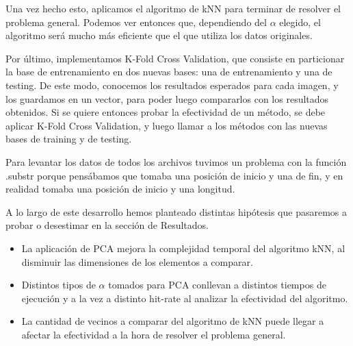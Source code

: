 \documentclass{article}
\begin{document}

Una vez hecho esto, aplicamos el algoritmo de kNN para terminar de resolver el problema general. Podemos ver entonces que, dependiendo del $\alpha$ elegido, el algoritmo será mucho más eficiente que el que utiliza los datos originales.

Por último, implementamos K-Fold Cross Validation, que consiste en particionar la base de entrenamiento en dos nuevas bases: una de entrenamiento y una de testing. De este modo, conocemos los resultados esperados para cada imagen, y los guardamos en un vector, para poder luego compararlos con los resultados obtenidos. Si se quiere entonces probar la efectividad de un método, se debe aplicar K-Fold Cross Validation, y luego llamar a los métodos con las nuevas bases de training y de testing.

Para levantar los datos de todos los archivos tuvimos un problema con la función .substr porque pensábamos que tomaba una posición de inicio y una de fin, y en realidad tomaba una posición de inicio y una longitud. 



A lo largo de este desarrollo hemos planteado distintas hipótesis que pasaremos a probar o desestimar en la sección de Resultados.
\begin{itemize}
  \item La aplicación de PCA mejora la complejidad temporal del algoritmo kNN, al disminuir las dimensiones de los elementos a comparar. 
  \item Distintos tipos de $\alpha$ tomados para PCA conllevan a distintos tiempos de ejecución y a la vez a distinto hit-rate al analizar la efectividad del algoritmo.
  \item La cantidad de vecinos a comparar del algoritmo de kNN puede llegar a afectar la efectividad a la hora de resolver el problema general.
  \end{itemize}
  
\end{document}
